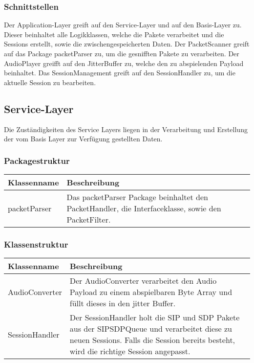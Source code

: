 \documentclass[a4,12pt]{scrartcl}
\begin{document}
\subsubsection{Schnittstellen}
Der Application-Layer greift auf den Service-Layer  und auf den Basis-Layer zu. Dieser beinhaltet alle Logikklassen, welche die Pakete verarbeitet und die Sessions erstellt, sowie die zwischengespeicherten Daten.
Der PacketScanner greift auf das Package packetParser zu, um die gesnifften Pakete zu verarbeiten.
Der AudioPlayer greifft auf den JitterBuffer zu, welche den zu abspielenden Payload beinhaltet.
Das SessionManagement greift auf den SessionHandler zu, um die aktuelle Session zu bearbeiten.

\subsection{Service-Layer}
Die Zuständigkeiten des Service Layers liegen in der Verarbeitung und Erstellung der vom Basis Layer zur Verfügung gestellten Daten.
\subsubsection{Packagestruktur}
\begin{table}[H]
\centering
    \begin{tabular}{@{}l p{11cm} @{}}\toprule    
    {Klassenname} & {Beschreibung}\\ \midrule
     packetParser& 
Das packetParser Package beinhaltet den PacketHandler, die Interfaceklasse, sowie den PacketFilter. \\ 
    \bottomrule
    \end{tabular}
\end{table} 
\subsubsection{Klassenstruktur}
\begin{table}[H]
\centering
    \begin{tabular}{@{}l p{11cm} @{}}\toprule    
    {Klassenname} & {Beschreibung}\\ \midrule
     AudioConverter& Der AudioConverter verarbeitet den Audio Payload zu einem abspielbaren Byte Array und füllt dieses in den jitter Buffer. \\ \addlinespace
        SessionHandler  & Der SessionHandler holt die SIP und SDP Pakete aus der SIPSDPQueue und verarbeitet diese zu neuen Sessions. Falls die Session bereits besteht, wird die richtige Session angepasst. \\ 
    \bottomrule
    \end{tabular}
\end{table}
\end{document}
